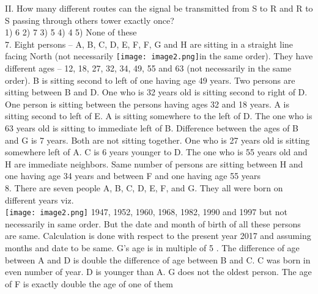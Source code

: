 \documentclass[
]{article}
\begin{document}
II. How many different routes can the signal be transmitted from S to R and R to S passing
through others tower exactly once?\\
1) 6 \hspace{2mm}2) 7 \hspace{2mm}3) 5 \hspace{2mm}4) 4 \hspace{2mm}5) None of these\\

7. Eight persons – A, B, C, D, E, F, F, G and H are sitting in a straight line facing North (not
necessarily \texttt{[image: image2.png]}in the same order). They have different ages – 12, 18, 27, 32, 34, 49, 55 and 63 (not
necessarily in the same order).
B is sitting second to left of one having age 49 years. Two persons are sitting between B and
D. One who is 32 years old is sitting second to right of D. One person is sitting between the
persons having ages 32 and 18 years. A is sitting second to left of E. A is sitting somewhere
to the left of D. The one who is 63 years old is sitting to immediate left of B. Difference
between the ages of B and G is 7 years. Both are not sitting together. One who is 27 years old
is sitting somewhere left of A. C is 6 years younger to D. The one who is 55 years old and H
are immediate neighbors. Same number of persons are sitting between H and one having
age 34 years and between F and one having age 55 years\\

8. There are seven people A, B, C, D, E, F, and G. They all were born on different years viz.\\
\texttt{[image: image2.png]}
1947, 1952, 1960, 1968, 1982, 1990 and 1997 but not necessarily in same order. But the date
and month of birth of all these persons are same. Calculation is done with respect to the
present year 2017 and assuming months and date to be same. G’s age is in multiple of 5 .
The difference of age between A and D is double the difference of age between B and C. C
was born in even number of year. D is younger than A. G does not the oldest person. The
age of F is exactly double the age of one of them\\
\end{document}
